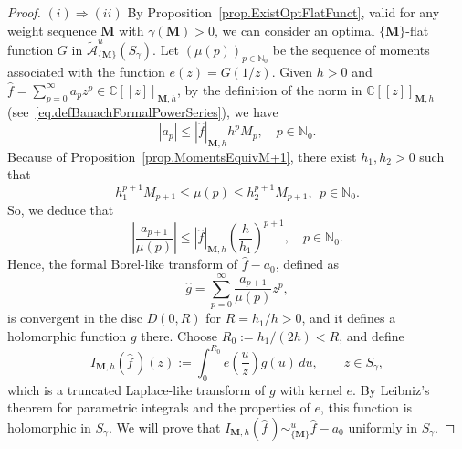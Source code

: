 \documentclass[11pt,a4paper]{article}
\theoremstyle{plain}
\theoremstyle{definition}
\numberwithin{equation}{section}
\newcommand{\N}{\mathbb{N}}
\newcommand{\C}{\mathbb{C}}
\newcommand{\M}{{\boldsymbol{M}}}
\def\ga{\gamma}
\begin{document}
\begin{proof}
	$(i)\Rightarrow (ii)$ By Proposition~\ref{prop.ExistOptFlatFunct}, valid for any weight sequence $\M$ with $\ga(\M)>0$, we can consider an optimal $\{\M\}$-flat function $G$ in $\widetilde{\mathcal{A}}^u_{\{\M\}}(S_{\ga})$. Let $(\mu(p))_{p\in\N_0}$ be the sequence of moments associated with the function $e(z)=G(1/z)$. Given $h>0$ and $\widehat{f}=\sum_{p=0}^\infty a_pz^p\in\C[[z]]_{\M,h}$, by the definition of the norm in $\C[[z]]_{\M,h}$ (see~\eqref{eq.defBanachFormalPowerSeries}), we have
	\begin{equation*}
		|a_p|\le |\widehat{f}|_{\M,h}h^{p}M_{p},\quad p\in\N_0.
	\end{equation*}
	Because of Proposition~\ref{prop.MomentsEquivM+1}, there exist $h_1,h_2>0$ such that
\begin{equation}\label{eq.boundsMmomentslog}
h_1^{p+1}M_{p+1}\le\mu(p)\le h_2^{p+1}M_{p+1},\ \ p\in\N_0.
\end{equation}
So, we deduce that
\begin{equation}\label{eq.boundsCoeffBorelTransf}
		\left|\frac{a_{p+1}}{\mu(p)}\right|\le |\widehat{f}|_{\M,h}\left(\frac{h}{h_1}\right)^{p+1},\quad p\in\N_0.
	\end{equation}
	Hence, the formal Borel-like transform of $\widehat{f}-a_0$, defined as
	\begin{equation*}
		\widehat{g}=\sum_{p=0}^\infty\frac{a_{p+1}}{\mu(p)}z^p,
	\end{equation*}
	is convergent in the disc $D(0,R)$ for $R=h_1/h>0$, and it defines a holomorphic function $g$ there. Choose $R_0:=h_1/(2h)<R$, and define
	\begin{equation*}
I_{\M,h}(\widehat{f}\,)(z):=\int_{0}^{R_0}e\left(\frac{u}{z}\right)g(u)\,du,\qquad z\in S_{\ga},
	\end{equation*}
	which is a truncated Laplace-like transform of $g$ with kernel $e$. By Leibniz's theorem for parametric integrals and the properties of $e$, this function is holomorphic in $S_{\ga}$. We will prove that
	$I_{\M,h}(\widehat{f}\,)\sim^u_{\{\M\}}\hat{f}-a_0$ uniformly in $S_{\ga}$.
	

\end{proof}
\end{document}
